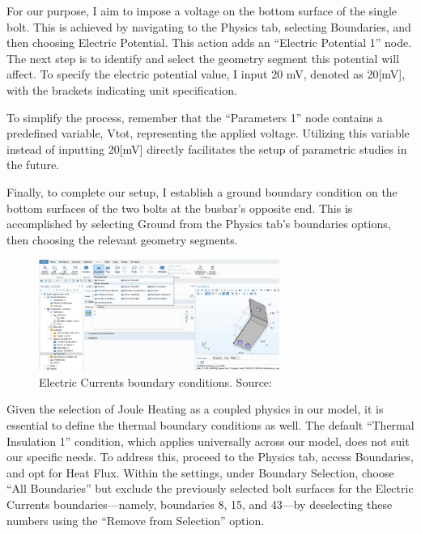 For our purpose, I aim to impose a voltage on the bottom surface of the single bolt. This is achieved by navigating to the Physics tab, selecting Boundaries, and then choosing Electric Potential. This action adds an ``Electric Potential 1'' node. The next step is to identify and select the geometry segment this potential will affect. To specify the electric potential value, I input 20 mV, denoted as 20[mV], with the brackets indicating unit specification.

To simplify the process, remember that the ``Parameters 1'' node contains a predefined variable, Vtot, representing the applied voltage. Utilizing this variable instead of inputting 20[mV] directly facilitates the setup of parametric studies in the future.

Finally, to complete our setup, I establish a ground boundary condition on the bottom surfaces of the two bolts at the busbar's opposite end. This is accomplished by selecting Ground from the Physics tab's boundaries options, then choosing the relevant geometry segments.

\begin{figure}[H]
  \centering
  \includegraphics[width=0.7\textwidth]{Chapters/Figures/Chapter 3 Figures/Electric Currents Boundary Conditions.png}
  \caption{Electric Currents boundary conditions. Source: \cite{multiphysics__modeling_nodate}}
  \label{fig:Electric Currents boundary conditions}
\end{figure}

Given the selection of Joule Heating as a coupled physics in our model, it is essential to define the thermal boundary conditions as well. The default ``Thermal Insulation 1'' condition, which applies universally across our model, does not suit our specific needs. To address this, proceed to the Physics tab, access Boundaries, and opt for Heat Flux. Within the settings, under Boundary Selection, choose ``All Boundaries'' but exclude the previously selected bolt surfaces for the Electric Currents boundaries—namely, boundaries 8, 15, and 43—by deselecting these numbers using the ``Remove from Selection'' option.


